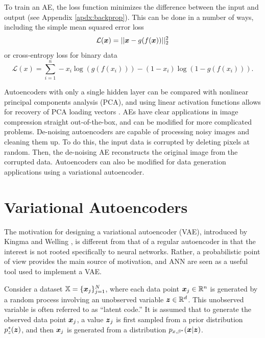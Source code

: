 To train an AE, the loss function minimizes the difference between the input and output (see Appendix \ref{apdx:backprop}). This can be done in a number of ways, including the simple mean squared error loss
\begin{equation}
  \mathcal{L}(\boldsymbol{x}) = || \boldsymbol{x} - g(f(\boldsymbol{x}))||_2^2
  \label{eq:mse}
\end{equation}
or cross-entropy loss for binary data
\begin{equation}
  \mathcal{L}(x) = \sum_{i=1}^n - x_i \log(g(f(x_i))) - (1-x_i)\log(1- g(f(x_i))).
  \label{eq:cross_entropy}
\end{equation}

Autoencoders with only a single hidden layer can be compared with nonlinear principal components analysis (PCA), and using linear activation functions allows for recovery of PCA loading vectors \cite{plaut2018}. AEs have clear applications in image compression straight out-of-the-box, and can be modified for more complicated problems. De-noising autoencoders \cite{vincent2008} are capable of processing noisy images and cleaning them up. To do this, the input data is corrupted by deleting pixels at random. Then, the de-noising AE reconstructs the original image from the corrupted data. Autoencoders can also be modified for data generation applications using a variational autoencoder.



\section{Variational Autoencoders}\label{sec:vae}

The motivation for designing a variational autoencoder (VAE), introduced by Kingma and Welling \cite{kingma2014}, is different from that of a regular autoencoder in that the interest is not rooted specifically to neural networks. Rather, a probabilistic point of view provides the main source of motivation, and ANN are seen as a useful tool used to implement a VAE.

Consider a dataset $\mathbb{X} = \{\boldsymbol{x}_j\}_{j=1}^N$, where each data point $\boldsymbol{x}_j \in \mathbb{R}^n$ is generated by a random process involving an unobserved variable $\boldsymbol{z} \in \mathbb{R}^d$. This unobserved variable is often referred to as ``latent code.'' It is assumed that to generate the observed data point $\boldsymbol{x}_j$, a value $\boldsymbol{z}_j$ is first sampled from a prior distribution $p_z^*(\boldsymbol{z})$, and then $\boldsymbol{x}_j$ is generated from a distribution $p_{x,\beta^*}(\boldsymbol{x} | \boldsymbol{z})$.

